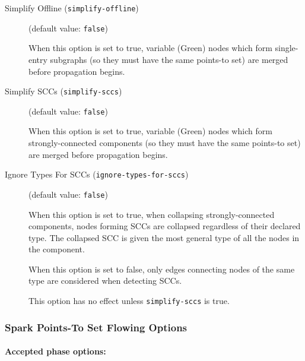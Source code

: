 \documentclass{article}
\begin{document}
\begin{description}

\item[Simplify Offline ({\tt simplify-offline})]
(default value: {\tt false})




When this option is set to true, variable (Green) nodes which form
single-entry subgraphs (so they must have the same points-to set) are
merged before propagation begins.
        


\item[Simplify SCCs ({\tt simplify-sccs})]
(default value: {\tt false})




When this option is set to true, variable (Green) nodes which form
strongly-connected components (so they must have the same points-to set)
are merged before propagation begins.
        


\item[Ignore Types For SCCs ({\tt ignore-types-for-sccs})]
(default value: {\tt false})




When this option is set to true, when collapsing strongly-connected
components, nodes forming SCCs are collapsed regardless of their declared type.
The collapsed SCC is given the most general type of all the nodes in the
component.

When this option is set to false, only edges connecting nodes of the
same type are considered when detecting SCCs.

This option has no effect unless {\tt simplify-sccs} is true.
        


\end{description}

\subsubsection{Spark Points-To Set Flowing Options}


\paragraph{Accepted phase options:} 
\end{document}

